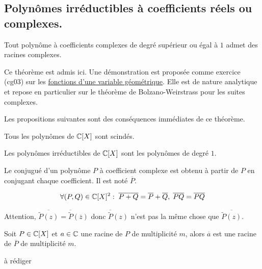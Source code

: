 \subsection{Polynômes irréductibles à coefficients réels ou complexes.}
\begin{thm}
 Tout polynôme à coefficients complexes de degré supérieur ou égal à $1$ admet des racines complexes.
\end{thm}
\begin{demo}
 Ce théorème est admis ici. Une démonstration est proposée comme exercice (cg03) sur les \href{http://back.maquisdoc.net/data/temptex/fexcg.pdf}{fonctions d'une variable géométrique}. Elle est de nature analytique et repose en particulier sur le théorème de Bolzano-Weirstrass pour les suites complexes.
\end{demo}
Les propositions suivantes sont des conséquences immédiates de ce théorème.
\begin{prop}
 Tous les polynômes de $\mathbb{C}[X]$ sont scindés.
\end{prop}
\begin{prop}
 Les polynômes irréductibles de $\mathbb{C}[X]$ sont les polynômes de degré $1$.
\end{prop}
\begin{defi}
 Le conjugué d'un polynôme $P$ à coefficient complexe est obtenu à partir de $P$ en conjugant chaque coefficient. Il est noté $\overline{P}$.
\end{defi}
\begin{prop}
 \begin{displaymath}
\forall (P,Q)\in \mathbb{C}[X]^2:\; \overline{P+Q}=\overline{P}+\overline{Q} ,\;\overline{PQ}=\overline{P}\overline{Q} 
 \end{displaymath}
\end{prop}
\begin{rem}
 Attention, $\overline{\widetilde{P}(z)} = \overline{\widetilde{P}}(\overline{z})$ donc $\overline{\widetilde{P}}(z)$ n'est pas la même chose que $\overline{\widetilde{P}(z)}$.
\end{rem}

\begin{prop}
 Soit $P\in \mathbb{C}[X]$ et $a\in \mathbb{C}$ une racine de $P$ de multiplicité $m$, alors $\overline{a}$ est une racine de $\overline{P}$ de multiplicité $m$.
\end{prop}
\begin{demo}
 à rédiger
\end{demo}


